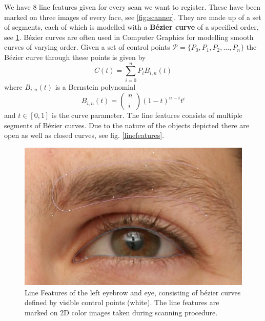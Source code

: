 We have 8 line features given for every scan we want to register. These have been marked on three images of every face, see \ref{fig:scanner}. They are made up of a set of segments, each of which is modelled with a \textbf{B\'{e}zier curve} of a specified order, see \ref{fig:linefeatures}. B\'{e}zier curves are often used in Computer
Graphics for modelling smooth curves of varying order. Given a set of control points $\mathcal{P} = \{P_{0}, P_{1}, P_{2}, \ldots, P_{n}\}$ the B\'{e}zier curve through these points is given by
\begin{equation}
    C(t)=\sum_{i=0}^{n}P_{i}B_{i,n}(t)
\end{equation}
where $B_{i,n}(t)$ is a Bernstein polynomial 
\begin{equation}
    B_{i,n}(t)=\begin{pmatrix} n \\ \\ i \end{pmatrix}(1-t)^{n-i}t^i
\end{equation}
and $t \in [0,1]$ is the curve parameter. The line features consists of multiple segments of B\'{e}zier curves. Due to the nature of the objects depicted there are open as well as closed curves, see fig. \ref{linefeatures}. 

\begin{figure}[h!]
    \centering
\includegraphics[width=\textwidth]{./resources/img/eyebrow_left.jpeg}
\caption{Line Features of the left eyebrow and eye, consisting of b\'{e}zier curves defined by visible control points (white). The line features are marked on 2D color images taken during scanning procedure.}
\label{fig:linefeatures}
\end{figure}

